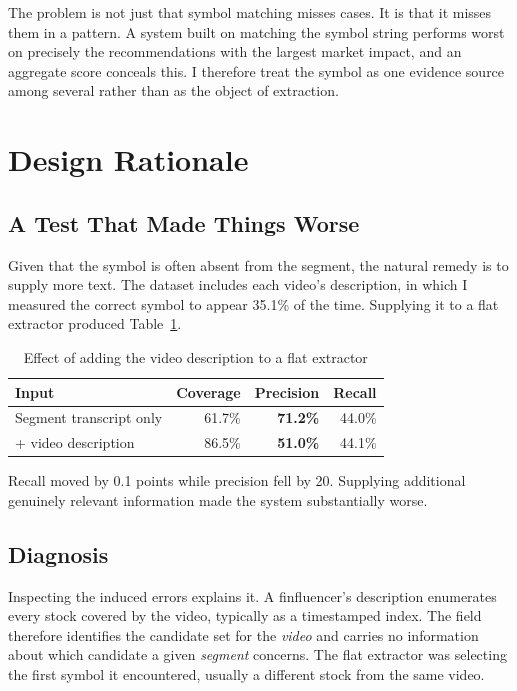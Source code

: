 \documentclass[conference]{IEEEtran}
\begin{document}
The problem is not just that symbol matching misses cases. It is that it
misses them in a pattern. A system built on matching the symbol
string performs worst on precisely the recommendations with the largest market
impact, and an aggregate score conceals this. I therefore treat the symbol as
one evidence source among several rather than as the object of extraction.

\section{Design Rationale}
\label{sec:rationale}

\subsection{A Test That Made Things Worse}

Given that the symbol is often absent from the segment, the natural remedy is to
supply more text. The dataset includes each video's description, in which I
measured the correct symbol to appear 35.1\% of the time. Supplying it to a flat
extractor produced Table~\ref{tab:negresult}.

\begin{table}[htbp]
\caption{Effect of adding the video description to a flat extractor}
\label{tab:negresult}
\centering
\begin{tabular}{lrrr}
\toprule
Input & Coverage & Precision & Recall \\
\midrule
Segment transcript only & 61.7\% & \textbf{71.2\%} & 44.0\% \\
+ video description & 86.5\% & \textbf{51.0\%} & 44.1\% \\
\bottomrule
\end{tabular}
\end{table}

Recall moved by 0.1 points while precision fell by 20. Supplying additional
genuinely relevant information made the system substantially worse.

\subsection{Diagnosis}

Inspecting the induced errors explains it. A finfluencer's description
enumerates every stock covered by the video, typically as a timestamped index.
The field therefore identifies the candidate set for the \emph{video} and
carries no information about which candidate a given \emph{segment} concerns.
The flat extractor was selecting the first symbol it encountered, usually a
different stock from the same video.
\end{document}

